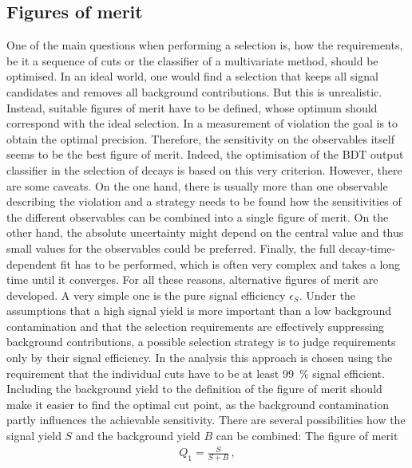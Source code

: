 
\subsection{Figures of merit}
\label{sec:dataanalysis:selection:fom}

One of the main questions when performing a selection is, how the
requirements, be it a sequence of cuts or the classifier of a multivariate
method, should be optimised. In an ideal world, one would find a selection
that keeps all signal candidates and removes all background contributions. But
this is unrealistic. Instead, suitable figures of merit have to be defined,
whose optimum should correspond with the ideal selection.  In a measurement of
\CP violation the goal is to obtain the optimal precision. Therefore, the
sensitivity on the \CP observables itself seems to be the best figure of
merit. Indeed, the optimisation of the BDT output classifier in the selection
of \BdToDD decays is based on this very criterion. However, there are some
caveats. On the one hand, there is usually more than one observable describing
the \CP violation and a strategy needs to be found how the sensitivities of
the different \CP observables can be combined into a single figure of merit.
On the other hand, the absolute uncertainty might depend on the central value
and thus small values for the \CP observables could be preferred. Finally, the
full decay-time-dependent fit has to be performed, which is often very complex
and takes a long time until it converges. For all these reasons, alternative
figures of merit are developed. A very simple one is the pure signal
efficiency $\epsilon_S$. Under the assumptions that a high signal yield is
more important than a low background contamination and that the selection
requirements are effectively suppressing background contributions, a possible
selection strategy is to judge requirements only by their signal efficiency.
In the \BdToJPsiKS analysis this approach is chosen using the requirement that
the individual cuts have to be at least \SI{99}{\percent} signal efficient.
Including the background yield to the definition of the figure of merit should
make it easier to find the optimal cut point, as the background contamination
partly influences the achievable sensitivity. There are several possibilities
how the signal yield $S$ and the background yield $B$ can be combined: The
figure of merit
\begin{align}
	Q_1 = \frac{S}{S + B}\,,
\end{align}
